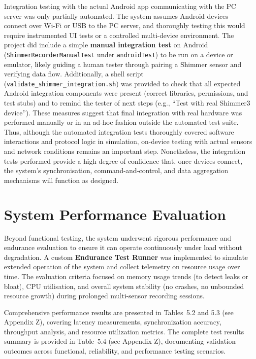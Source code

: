 Integration testing with the actual Android app communicating with the PC server was only partially automated. The system assumes Android devices connect over Wi-Fi or USB to the PC server, and thoroughly testing this would require instrumented UI tests or a controlled multi-device environment. The project did include a simple \textbf{manual integration test} on Android (\texttt{ShimmerRecorderManualTest} under \texttt{androidTest}) to be run on a device or emulator, likely guiding a human tester through pairing a Shimmer sensor and verifying data flow. Additionally, a shell script (\texttt{validate\_shimmer\_integration.sh}) was provided to check that all expected Android integration components were present (correct libraries, permissions, and test stubs) and to remind the tester of next steps (e.g., ``Test with real Shimmer3 device''). These measures suggest that final integration with real hardware was performed manually or in an ad-hoc fashion outside the automated test suite. Thus, although the automated integration tests thoroughly covered software interactions and protocol logic in simulation, on-device testing with actual sensors and network conditions remains an important step. Nonetheless, the integration tests performed provide a high degree of confidence that, once devices connect, the system's synchronisation, command-and-control, and data aggregation mechanisms will function as designed.


\section{System Performance Evaluation}
Beyond functional testing, the system underwent rigorous performance and endurance evaluation to ensure it can operate continuously under load without degradation. A custom \textbf{Endurance Test Runner} was implemented to simulate extended operation of the system and collect telemetry on resource usage over time. The evaluation criteria focused on memory usage trends (to detect leaks or bloat), CPU utilisation, and overall system stability (no crashes, no unbounded resource growth) during prolonged multi-sensor recording sessions.

Comprehensive performance results are presented in Tables~5.2 and 5.3 (see Appendix Z), covering latency measurements, synchronization accuracy, throughput analysis, and resource utilization metrics. The complete test results summary is provided in Table~5.4 (see Appendix Z), documenting validation outcomes across functional, reliability, and performance testing scenarios.

